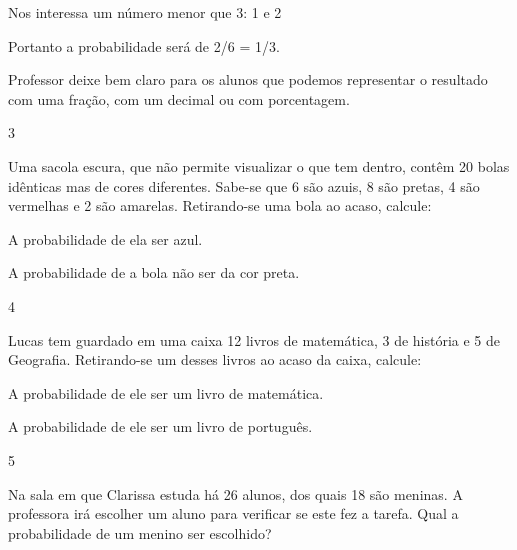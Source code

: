 \begin{escolha}
\begin{escolha}
Nos interessa um número menor que 3: 1 e 2

Portanto a probabilidade será de 2/6 = 1/3.

Professor deixe bem claro para os alunos que podemos representar o
resultado com uma fração, com um decimal ou com porcentagem.

\num{3}

Uma sacola escura, que não permite visualizar o que tem dentro, contêm
20 bolas idênticas mas de cores diferentes. Sabe-se que 6 são azuis, 8
são pretas, 4 são vermelhas e 2 são amarelas. Retirando-se uma bola ao
acaso, calcule:

\begin{escolha}

\item
  A probabilidade de ela ser azul.

\item
  A probabilidade de a bola não ser da cor preta.
\end{escolha}


\num{4}

Lucas tem guardado em uma caixa 12 livros de matemática, 3 de história e
5 de Geografia. Retirando-se um desses livros ao acaso da caixa,
calcule:

\begin{escolha}

\item
  A probabilidade de ele ser um livro de matemática.

\item
  A probabilidade de ele ser um livro de português.

\end{escolha}

\num{5}

Na sala em que Clarissa estuda há 26 alunos, dos quais 18 são meninas. A
professora irá escolher um aluno para verificar se este fez a tarefa.
Qual a probabilidade de um menino ser escolhido?


\end{escolha}
\end{escolha}
